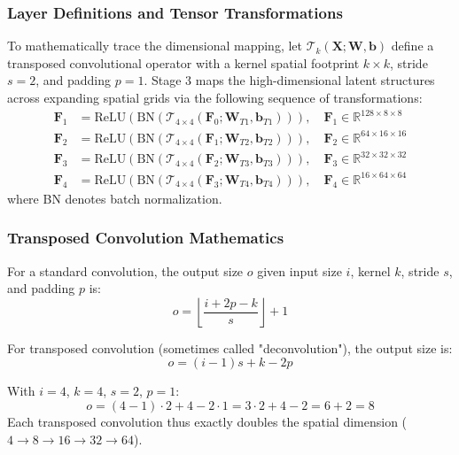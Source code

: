 \documentclass[12pt,a4paper,oneside]{report}
\begin{document}
\subsubsection{Layer Definitions and Tensor Transformations}

To mathematically trace the dimensional mapping, let $\mathcal{T}_k(\mathbf{X}; \mathbf{W}, \mathbf{b})$ define a transposed convolutional operator with a kernel spatial footprint $k \times k$, stride $s=2$, and padding $p=1$. Stage 3 maps the high-dimensional latent structures across expanding spatial grids via the following sequence of transformations:
\begin{align}
\mathbf{F}_1 &= \text{ReLU}\left(\text{BN}\left(\mathcal{T}_{4\times4}(\mathbf{F}_0; \mathbf{W}_{T1}, \mathbf{b}_{T1})\right)\right), \quad \mathbf{F}_1 \in \mathbb{R}^{128 \times 8 \times 8} \\
\mathbf{F}_2 &= \text{ReLU}\left(\text{BN}\left(\mathcal{T}_{4\times4}(\mathbf{F}_1; \mathbf{W}_{T2}, \mathbf{b}_{T2})\right)\right), \quad \mathbf{F}_2 \in \mathbb{R}^{64 \times 16 \times 16} \\
\mathbf{F}_3 &= \text{ReLU}\left(\text{BN}\left(\mathcal{T}_{4\times4}(\mathbf{F}_2; \mathbf{W}_{T3}, \mathbf{b}_{T3})\right)\right), \quad \mathbf{F}_3 \in \mathbb{R}^{32 \times 32 \times 32} \\
\mathbf{F}_4 &= \text{ReLU}\left(\text{BN}\left(\mathcal{T}_{4\times4}(\mathbf{F}_3; \mathbf{W}_{T4}, \mathbf{b}_{T4})\right)\right), \quad \mathbf{F}_4 \in \mathbb{R}^{16 \times 64 \times 64}
\end{align}
where BN denotes batch normalization.

\subsubsection{Transposed Convolution Mathematics}

For a standard convolution, the output size $o$ given input size $i$, kernel $k$, stride $s$, and padding $p$ is:
\begin{equation}
o = \left\lfloor \frac{i + 2p - k}{s} \right\rfloor + 1
\end{equation}

For transposed convolution (sometimes called "deconvolution"), the output size is:
\begin{equation}
o = (i - 1)s + k - 2p
\end{equation}

With $i=4$, $k=4$, $s=2$, $p=1$:
\begin{equation}
o = (4 - 1)\cdot 2 + 4 - 2\cdot 1 = 3\cdot 2 + 4 - 2 = 6 + 2 = 8
\end{equation}
Each transposed convolution thus exactly doubles the spatial dimension ($4 \rightarrow 8 \rightarrow 16 \rightarrow 32 \rightarrow 64$).
\end{document}

